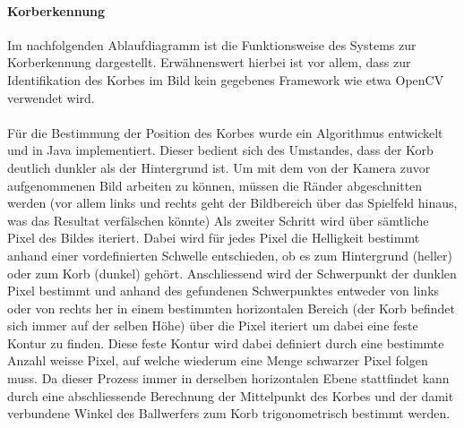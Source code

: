 	\paragraph{Korberkennung\\}
	Im nachfolgenden Ablaufdiagramm ist die Funktionsweise des Systems zur Korberkennung dargestellt. Erwähnenswert hierbei ist vor allem, dass zur Identifikation des Korbes im Bild kein gegebenes Framework wie etwa OpenCV verwendet wird. \\
	\\
	Für die Bestimmung der Position des Korbes wurde ein Algorithmus entwickelt und in Java implementiert. Dieser bedient sich des Umstandes, dass der Korb deutlich dunkler als der Hintergrund ist. Um mit dem von der Kamera zuvor aufgenommenen Bild arbeiten zu können, müssen die Ränder abgeschnitten werden (vor allem links und rechts geht der Bildbereich über das Spielfeld hinaus, was das Resultat verfälschen könnte) Als zweiter Schritt wird über sämtliche Pixel des Bildes iteriert. Dabei wird für jedes Pixel die Helligkeit bestimmt anhand einer vordefinierten Schwelle entschieden, ob es zum Hintergrund (heller) oder zum Korb (dunkel) gehört. Anschliessend wird der Schwerpunkt der dunklen Pixel bestimmt und anhand des gefundenen Schwerpunktes entweder von links oder von rechts her in einem bestimmten horizontalen Bereich (der Korb befindet sich immer auf der selben Höhe) über die Pixel iteriert um dabei eine feste Kontur zu finden. Diese feste Kontur wird dabei definiert durch eine bestimmte Anzahl weisse Pixel, auf welche wiederum eine Menge schwarzer Pixel folgen muss. Da dieser Prozess immer in derselben horizontalen Ebene stattfindet kann durch eine abschliessende Berechnung der Mittelpunkt des Korbes und der damit verbundene Winkel des Ballwerfers zum Korb trigonometrisch bestimmt werden.\\
	
